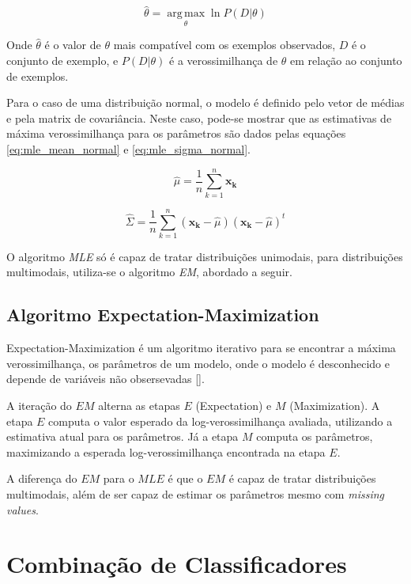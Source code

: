 \begin{equation}
\label{eq:mle}
\hat{\theta} = \operatorname*{arg\,max}_{\theta} \ln P(D | \theta)
\end{equation}

Onde $\hat{\theta}$ é o valor de $\theta$ mais compatível com os exemplos observados, $D$ é o conjunto de exemplo, e $P(D | \theta)$ é a verossimilhança de $\theta$ em relação ao conjunto de exemplos.

Para o caso de uma distribuição normal, o modelo é definido pelo vetor de médias e pela matrix de covariância. Neste caso, pode-se mostrar que as estimativas de máxima verossimilhança para os parâmetros são dados pelas equações \ref{eq:mle_mean_normal} e \ref{eq:mle_sigma_normal}.

\begin{equation}
\label{eq:mle_mean_normal}
\hat{\mu} = \frac{1}{n} \sum_{k = 1}^{n} \mathbf{x_k}
\end{equation}

\begin{equation}
\label{eq:mle_sigma_normal}
\hat{\Sigma } =  \dfrac{1}{n} \sum_{k = 1}^{n} (\mathbf{x_k} - \hat{\mu}) (\mathbf{x_k} - \hat{\mu})^t
\end{equation}

O algoritmo \textit{MLE} só é capaz de tratar distribuições unimodais, para distribuições multimodais, utiliza-se o algoritmo \textit{EM}, abordado a seguir.

\subsection{Algoritmo Expectation-Maximization}
\label{subsec:em}
Expectation-Maximization é um algoritmo iterativo para se encontrar a máxima verossimilhança, os parâmetros de um modelo, onde o modelo é desconhecido e depende de variáveis não obsersevadas [\cite{aulas}].

A iteração do $EM$ alterna as etapas $E$ (Expectation) e $M$ (Maximization). A etapa $E$ computa o valor esperado da log-verossimilhança avaliada, utilizando a estimativa atual para os parâmetros. Já a etapa $M$ computa os parâmetros, maximizando a esperada log-verossimilhança encontrada na etapa $E$.

A diferença do $EM$ para o $MLE$ é que o $EM$ é capaz de tratar distribuições multimodais, além de ser capaz de estimar os parâmetros mesmo com \textit{missing values}.

\section{Combinação de Classificadores}

